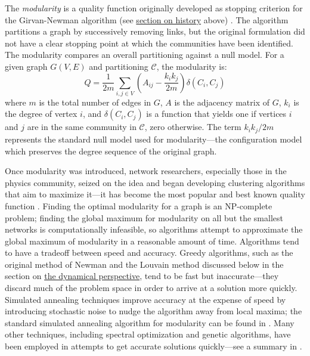 The \emph{modularity} is a quality function originally developed as
stopping criterion for the Girvan-Newman algorithm (see
\protect\hyperlink{history}{section on history} above)
\autocites{newman_finding_2004}{newman_modularity_2006}. The algorithm
partitions a graph by successively removing links, but the original
formulation did not have a clear stopping point at which the communities
have been identified. The modularity compares an overall partitioning
against a null model. For a given graph \(G(V, E)\) and partitioning
\(\mathcal{C}\), the modularity is:
\[Q = \frac{1}{2m} \sum_{i,j \in V} \left(A_{ij} - \frac{k_i k_j}{2m}\right) \delta(C_i, C_j)\]
where \(m\) is the total number of edges in \(G\), \(A\) is the
adjacency matrix of \(G\), \(k_i\) is the degree of vertex \(i\), and
\(\delta(C_i, C_j)\) is a function that yields one if vertices \(i\) and
\(j\) are in the same community in \(\mathcal{C}\), zero otherwise. The
term \(k_i k_j / 2m\) represents the standard null model used for
modularity---the configuration model which preserves the degree sequence
of the original graph.

Once modularity was introduced, network researchers, especially those in
the physics community, seized on the idea and began developing
clustering algorithms that aim to maximize it---it has become the most
popular and best known quality function
\autocite{fortunato_community_2010}. Finding the optimal modularity for
a graph is an NP-complete problem; finding the global maximum for
modularity on all but the smallest networks is computationally
infeasible, so algorithms attempt to approximate the global maximum of
modularity in a reasonable amount of time. Algorithms tend to have a
tradeoff between speed and accuracy. Greedy algorithms, such as the
original method of Newman \autocite{newman_fast_2004} and the Louvain
method \autocite{blondel_fast_2008} discussed below in the section on
\protect\hyperlink{the-dynamical-perspective}{the dynamical
perspective}, tend to be fast but inaccurate---they discard much of the
problem space in order to arrive at a solution more quickly. Simulated
annealing techniques improve accuracy at the expense of speed by
introducing stochastic noise to nudge the algorithm away from local
maxima; the standard simulated annealing algorithm for modularity can be
found in \autocite{guimera_functional_2005}. Many other techniques,
including spectral optimization and genetic algorithms, have been
employed in attempts to get accurate solutions quickly---see a summary
in \autocite{fortunato_community_2010}.

